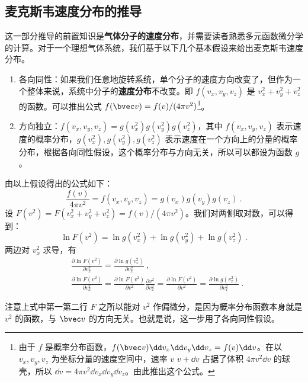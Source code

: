 \subsection{麦克斯韦速度分布的推导}
这一部分推导的前置知识是\textbf{气体分子的速度分布}，并需要读者熟悉多元函数微分学的计算。对于一个理想气体系统，我们基于以下几个基本假设来给出麦克斯韦速度分布。

\begin{enumerate}
\item 各向同性：如果我们任意地旋转系统，单个分子的速度方向改变了，但作为一个整体来说，系统中分子的\textbf{速度分布}不改变。即 $f(v_x,v_y,v_z)$ 是 $v_x^2+v_y^2+v_z^2$ 的函数。可以推出公式 $f(\bvec v)=f(v)/(4\pi v^2)$\footnote{由于 $f$ 是概率分布函数，$f(\bvec v)\dd v_x\dd v_y\dd v_z=f(v)\dd v$。在以 $v_x,v_y,v_z$ 为坐标分量的速度空间中，速率 $v\text{~}v+\dd v$ 占据了体积 $4\pi v^2\dd v$ 的球壳，所以 $\dd v=4\pi v^2 \dd v_x\dd v_y\dd v_z$。由此推出这个公式。}。

\item 方向独立：$f(v_x,v_y,v_z)=g(v_x^2)g(v_y^2)g(v_z^2)$，其中 $f(v_x,v_y,v_z)$ 表示速度的概率分布，$g(v_x^2),g(v_y^2),g(v_z^2)$ 表示速度在一个方向上的分量的概率分布，根据各向同性假设，这个概率分布与方向无关，所以可以都设为函数 $g$。
\end{enumerate}

由以上假设得出的公式如下：
\begin{equation}
\frac{f(v)}{4\pi v^2}=f(v_x,v_y,v_z)=g(v_x)g(v_y)g(v_z)~.
\end{equation}
设 $F(v^2)=F(v_x^2+v_y^2+v_z^2)=f(v)/(4\pi v^2)$。我们对两侧取对数，可以得到：
\begin{equation}
\ln F(v^2)=\ln g(v_x^2)+\ln g(v_y^2)+\ln g(v_z^2)~.
\end{equation}
两边对 $v_x^2$ 求导，有
\begin{equation}
\begin{aligned}
&\frac{\partial \ln F(v^2)}{\partial v_x^2}=\frac{\partial \ln g(v_x^2)}{\partial v_x^2}~,
\\
&\frac{\partial \ln F(v^2)}{\partial v_x^2}=\frac{\partial \ln F(v^2)}{\partial v^2} \frac{\partial v^2}{\partial v_x^2}=\frac{\partial \ln F(v^2)}{\partial v^2}=\frac{\partial \ln g(v_x^2)}{\partial v_x^2}~.
\end{aligned}
\end{equation}

注意上式中第一第二行 $F$ 之所以能对 $v^2$ 作偏微分，是因为概率分布函数本身就是 $v^2$ 的函数，与 $\bvec v$ 的方向无关。也就是说，这一步用了各向同性假设。

